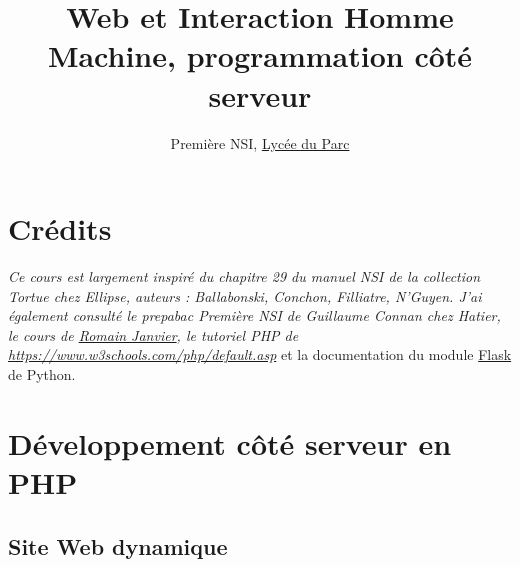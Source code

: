 \documentclass[
  11pt,
]{article}
\title{Web et Interaction Homme Machine, programmation côté serveur}
\author{Première NSI, \href{https://frederic-junier.org/}{Lycée du
Parc}}
\date{}
\newcounter{def}
\newcounter{cours}
\begin{document}
\maketitle

\renewcommand*\contentsname{Table des matières}
{
\hypersetup{linkcolor=}
\setcounter{tocdepth}{3}
\tableofcontents
}
\hypertarget{cruxe9dits}{%
\section*{Crédits}\label{cruxe9dits}}

\emph{Ce cours est largement inspiré du chapitre 29 du manuel NSI de la
collection Tortue chez Ellipse, auteurs : Ballabonski, Conchon,
Filliatre, N'Guyen. J'ai également consulté le prepabac Première NSI de
Guillaume Connan chez Hatier, le cours de
\href{http://nsi.janviercommelemois.fr/}{Romain Janvier}, le tutoriel
PHP de \url{https://www.w3schools.com/php/default.asp}} et la
documentation du module
\href{https://flask.palletsprojects.com/en/1.1.x/}{Flask} de Python.

\hypertarget{duxe9veloppement-cuxf4tuxe9-serveur-en-php}{%
\section{Développement côté serveur en
PHP}\label{duxe9veloppement-cuxf4tuxe9-serveur-en-php}}

\hypertarget{site-web-dynamique}{%
\subsection{Site Web dynamique}\label{site-web-dynamique}}
\end{document}
